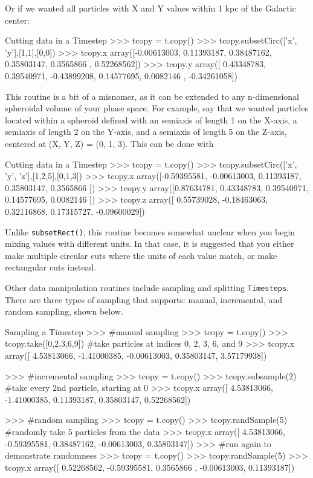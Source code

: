 \documentclass{article}
\begin{document}
Or if we wanted all particles with X and Y values within 1 kpc of the Galactic center: \\

\begin{codelisting}{Cutting data in a Timestep}
>>> tcopy = t.copy()
>>> tcopy.subsetCirc(['x', 'y'],[1,1],[0,0])
>>> tcopy.x
array([-0.00613003,  0.11393187,  0.38487162,  0.35803147,  0.3565866 ,
        0.52268562])
>>> tcopy.y
array([ 0.43348783,  0.39540971, -0.43899208,  0.14577695,  0.0082146 ,
       -0.34261058])
\end{codelisting}

This routine is a bit of a misnomer, as it can be extended to any n-dimensional spheroidal volume of your phase space. For example, say that we wanted particles located within a spheroid defined with an semiaxis of length 1 on the X-axis, a semiaxis of length 2 on the Y-axis, and a semiaxis of length 5 on the Z-axis, centered at (X, Y, Z) = (0, 1, 3). This can be done with \\

\begin{codelisting}{Cutting data in a Timestep}
>>> tcopy = t.copy()
>>> tcopy.subsetCirc(['x', 'y', 'z'],[1,2,5],[0,1,3])
>>> tcopy.x
array([-0.59395581, -0.00613003,  0.11393187,  0.35803147,  0.3565866 ])
>>> tcopy.y
array([0.87634781, 0.43348783, 0.39540971, 0.14577695, 0.0082146 ])
>>> tcopy.z
array([ 0.55739028, -0.18463063,  0.32116868,  0.17315727, -0.09600029])
\end{codelisting}

Unlike \verb!subsetRect()!, this routine becomes somewhat unclear when you begin mixing values with different units. In that case, it is suggested that you either make multiple circular cuts where the units of each value match, or make rectangular cuts instead.  

Other data manipulation routines include sampling and splitting \verb!Timesteps!. There are three types of sampling that \mwahpy supports: manual, incremental, and random sampling, shown below. \\

\begin{codelisting}{Sampling a Timestep}
>>> #manual sampling
>>> tcopy = t.copy()
>>> tcopy.take([0,2,3,6,9]) #take particles at indices 0, 2, 3, 6, and 9
>>> tcopy.x
array([ 4.53813066, -1.41000385, -0.00613003,  0.35803147,  3.57179938])

>>> #incremental sampling
>>> tcopy = t.copy()
>>> tcopy.subsample(2) #take every 2nd particle, starting at 0
>>> tcopy.x
array([ 4.53813066, -1.41000385,  0.11393187,  0.35803147,  0.52268562])

>>> #random sampling
>>> tcopy = t.copy()
>>> tcopy.randSample(5) #randomly take 5 particles from the data
>>> tcopy.x
array([ 4.53813066, -0.59395581,  0.38487162, -0.00613003,  0.35803147])
>>> #run again to demonstrate randomness
>>> tcopy = t.copy()
>>> tcopy.randSample(5)
>>> tcopy.x
array([ 0.52268562, -0.59395581,  0.3565866 , -0.00613003,  0.11393187])
\end{codelisting}
\end{document}
